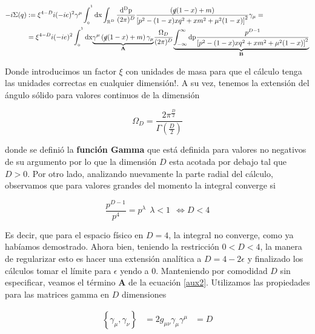 \documentclass{article}
\numberwithin{equation}{section}
\begin{document}
\begin{equation}\label{aux2}
\begin{aligned}
-i\Sigma(q)&:=\xi^{4-D}i(-ie)^{2}\gamma^{\mu}\int_{_{0}}^{^{1}}\mathrm{dx}\int_{\mathbb{R}^{D}}\frac{\mathrm{d^{D}p}}{(2\pi)^{D}}\frac{\left(\cancel{q}(1-x)+m\right)}{\left[p^{2}-(1-x)xq^{2} + x m^{2} + \mu^{2}(1-x)\right]^{2}} \gamma_{\mu}=\\
&=\xi^{4-D} i(-ie)^{2}\int_{_{0}}^{^{1}}\mathrm{dx}\underset{\textbf{A}}{\underbrace{\gamma^{\mu}\left(\cancel{q}(1-x)+m\right) \gamma_{\mu}}}\frac{\Omega_D}{(2\pi)^{D}}\underset{\textbf{B}}{\underbrace{\int_{-\infty}^{\infty}\mathrm{dp}\frac{p^{D-1}}{\left[p^{2}-(1-x)xq^{2} + x m^{2} + \mu^{2}(1-x)\right]^{2}}}}
\end{aligned}
\end{equation}

Donde introducimos un factor $ \xi $ con unidades de masa para que el cálculo tenga las unidades correctas en cualquier dimensión!. A su vez, tenemos la extensión del ángulo sólido para valores continuos de la dimensión

\begin{equation}\label{angulosolido}
\Omega_D = \frac{2 \pi^{\frac{D}{2}}}{\Gamma (\frac{D}{2})}
\end{equation}

donde se definió la \textbf{función Gamma} que está definida para valores no negativos de su argumento por lo que la dimensión $ D $ esta acotada por debajo tal que $ D>0 $. Por otro lado, analizando nuevamente la parte radial del cálculo, observamos que para valores grandes del momento la integral converge si

\begin{equation}\label{key}
\frac{p^{D-1}}{p^4} = p^{\lambda} \ \ \lambda<1 \ \ \iff D < 4
\end{equation}

Es decir, que para el espacio físico en $ D=4 $, la integral no converge, como ya habíamos demostrado. Ahora bien, teniendo la restricción $ 0<D<4 $, la manera de regularizar esto es hacer una extensión analítica a $ D= 4 -2\epsilon $ y finalizado los cálculos tomar el límite para $ \epsilon $ yendo a $ 0 $. Manteniendo por comodidad $ D $ sin especificar, veamos el término $ \textbf{A} $ de la ecuación \ref{aux2}. Utilizamos las propiedades para las matrices gamma en $ D $ dimensiones

\begin{equation}
\begin{aligned}
\left\{\gamma_{\mu},\gamma_{\nu}\right\} &= 2 g_{\mu\nu}
\gamma_{\mu}\gamma^{\mu}&=D
\end{aligned}
\end{equation}
\end{document}
